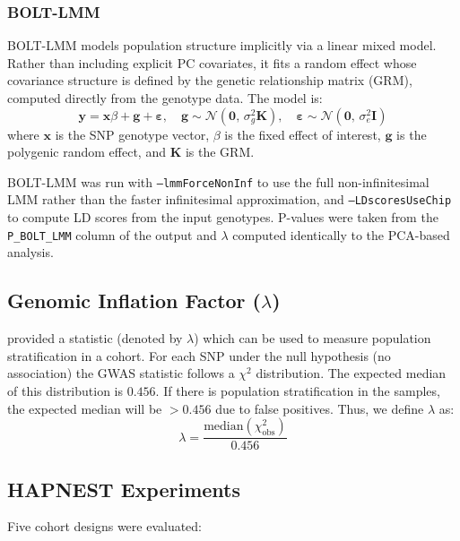 \documentclass[unnumsec,webpdf,contemporary,large]{oup-authoring-template}
\theoremstyle{thmstyleone}
\theoremstyle{thmstyletwo}
\theoremstyle{thmstylethree}
\begin{document}
\subsubsection{BOLT-LMM}
BOLT-LMM \citep{boltlmm} models population structure implicitly via a linear mixed model. Rather than including explicit PC covariates, it fits a random effect whose covariance structure is defined by the genetic relationship matrix (GRM), computed directly from the genotype data. The model is:
\begin{equation}
    \mathbf{y} = \mathbf{x}\beta + \mathbf{g} + \boldsymbol{\varepsilon}, \quad
    \mathbf{g} \sim \mathcal{N}(\mathbf{0},\, \sigma^2_g \mathbf{K}), \quad
    \boldsymbol{\varepsilon} \sim \mathcal{N}(\mathbf{0},\, \sigma^2_e \mathbf{I})
\end{equation}
where $\mathbf{x}$ is the SNP genotype vector, $\beta$ is the fixed effect of interest, $\mathbf{g}$ is the polygenic random effect, and $\mathbf{K}$ is the GRM.

BOLT-LMM was run with \texttt{--lmmForceNonInf} to use the full non-infinitesimal LMM rather than the faster infinitesimal approximation, and \texttt{--LDscoresUseChip} to compute LD scores from the input genotypes. P-values were taken from the \texttt{P\_BOLT\_LMM} column of the output and $\lambda$ computed identically to the PCA-based analysis.

\subsection{Genomic Inflation Factor ($\lambda$)}
\citet{Devlin1999} provided a statistic (denoted by $\lambda$) which can be used to measure population stratification in a cohort. For each SNP under the null hypothesis (no association) the GWAS statistic follows a $\chi^2$ distribution. The expected median of this distribution is $0.456$. If there is population stratification in the samples, the expected median will be $> 0.456$ due to false positives. Thus, we define $\lambda$ as:
\begin{equation}
    \lambda = \frac{\text{median}(\chi^2_{\text{obs}})}{0.456}
\end{equation}

\subsection{HAPNEST Experiments}
Five cohort designs were evaluated:
\end{document}
